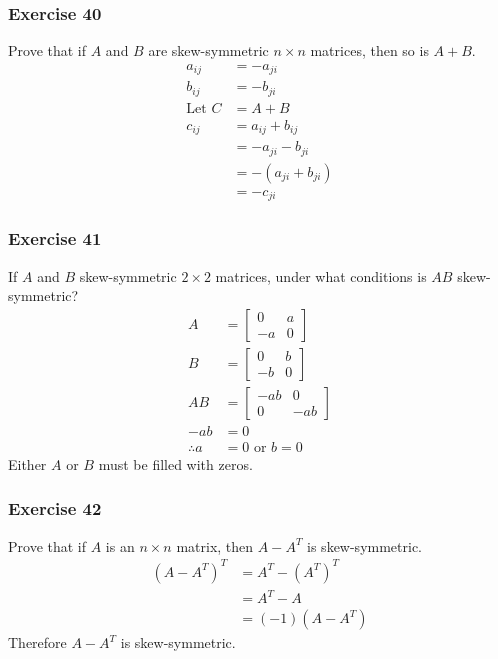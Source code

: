 \documentclass[letterpaper, 12pt]{math}
\begin{document}
\subsubsection*{Exercise 40}
Prove that if \( A \) and \( B \) are skew-symmetric \( n\times n \) matrices,
then so is \( A+B \).
\begin{align*}
  a_{ij} &= -a_{ji} \\
  b_{ij} &= -b_{ji} \\
  \text{Let } C &= A+B \\
  c_{ij} &= a_{ij}+b_{ij} \\
  &= -a_{ji}-b_{ji} \\
  &= -(a_{ji}+b_{ji}) \\
  &= -c_{ji}
\end{align*}

\subsubsection*{Exercise 41}
If \( A \) and \( B \) skew-symmetric \( 2\times2 \) matrices, under what
conditions is \( AB \) skew-symmetric?
\begin{align*}
  A &= \begin{bmatrix}
    0 & a \\
    -a & 0
  \end{bmatrix} \\
  B &= \begin{bmatrix}
    0 & b \\
    -b & 0
  \end{bmatrix} \\
  AB &= \begin{bmatrix}
    -ab & 0 \\
    0 & -ab
  \end{bmatrix} \\
  -ab &= 0 \\
  \therefore a &= 0 \text{ or } b = 0
\end{align*}
Either \( A \) or \( B \) must be filled with zeros.

\subsubsection*{Exercise 42}
Prove that if \( A \) is an \( n\times n \) matrix, then \( A-A^T \) is
skew-symmetric.
\begin{align*}
  (A-A^T)^T &= A^T-(A^T)^T \\
  &= A^T-A \\
  &= (-1)(A-A^T)
\end{align*}
Therefore \( A-A^T \) is skew-symmetric.
\end{document}
